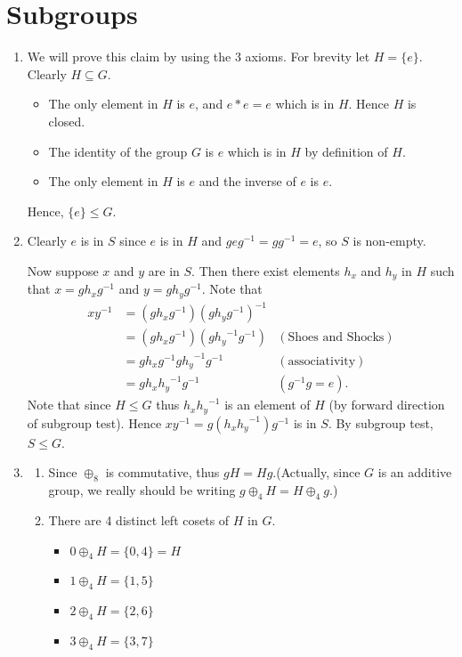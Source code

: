 \section{Subgroups}
\begin{enumerate}
    \item We will prove this claim by using the 3 axioms. For brevity let $H = \{e\}$. Clearly $H \subseteq G$.
    \begin{itemize}
        \item The only element in $H$ is $e$, and $e \ast e = e$ which is in $H$. Hence $H$ is closed.
        \item The identity of the group $G$ is $e$ which is in $H$ by definition of $H$.
        \item The only element in $H$ is $e$ and the inverse of $e$ is $e$.
    \end{itemize}
    Hence, $\{e\} \leq G$.

    \item Clearly $e$ is in $S$ since $e$ is in $H$ and $geg^{-1} = gg^{-1} = e$, so $S$ is non-empty.

    Now suppose $x$ and $y$ are in $S$. Then there exist elements $h_x$ and $h_y$ in $H$ such that $x = gh_xg^{-1}$ and $y = gh_yg^{-1}$. Note that
    \begin{align*}
        xy^{-1} &= (gh_xg^{-1})(gh_yg^{-1})^{-1}\\
        &= (gh_xg^{-1})(g{h_y}^{-1}g^{-1}) & (\text{Shoes and Shocks})\\
        &= gh_xg^{-1}g{h_y}^{-1}g^{-1} & (\text{associativity})\\
        &= gh_x{h_y}^{-1}g^{-1} & (g^{-1}g = e).
    \end{align*}
    Note that since $H \leq G$ thus $h_x{h_y}^{-1}$ is an element of $H$ (by forward direction of subgroup test). Hence $xy^{-1} = g(h_x{h_y}^{-1})g^{-1}$ is in $S$. By subgroup test, $S \leq G$.

    \item \begin{enumerate}[label=(\alph*)]
        \item Since $\oplus_8$ is commutative, thus $gH = Hg$.\newline(Actually, since $G$ is an additive group, we really should be writing $g \oplus_4 H = H \oplus_4 g$.)
        \item There are 4 distinct left cosets of $H$ in $G$.
        \begin{itemize}
            \item $0 \oplus_4 H = \{0, 4\} = H$
            \item $1 \oplus_4 H = \{1, 5\}$
            \item $2 \oplus_4 H = \{2, 6\}$
            \item $3 \oplus_4 H = \{3, 7\}$
        \end{itemize}
    \end{enumerate}


\end{enumerate}
